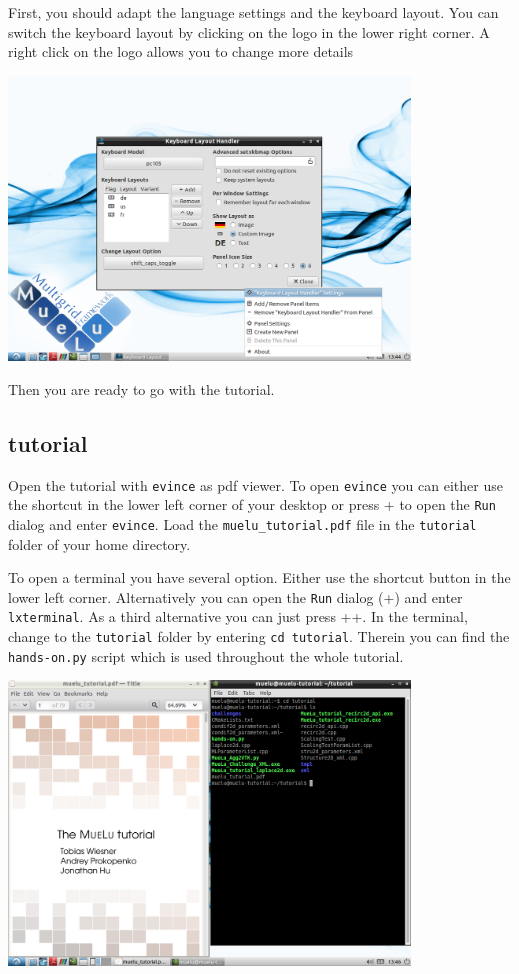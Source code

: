\documentclass[10pt,fleqn]{book}
\begin{document}
First, you should adapt the language settings and the keyboard layout. You can switch the keyboard layout by clicking on the logo in the lower right corner. A right click on the logo allows you to change more details
\begin{center}\includegraphics[width=0.8\textwidth]{pics/lubuntu_3.png} \end{center}

Then you are ready to go with the tutorial.

\subsection{\muelu tutorial}

Open the tutorial with \verb|evince| as pdf viewer. To open \verb|evince| you can either use the shortcut in the lower left corner of your desktop or press \Alt+ to open the \verb|Run| dialog and enter \verb|evince|. Load the \verb|muelu_tutorial.pdf| file in the \verb|tutorial| folder of your home directory.

To open a terminal you have several option. Either use the shortcut button in the lower left corner. Alternatively you can open the \verb|Run| dialog (\Alt+) and enter \verb|lxterminal|. As a third alternative you can just press \Ctrl+\Alt+. In the terminal, change to the \verb|tutorial| folder by entering \verb|cd tutorial|. Therein you can find the \verb|hands-on.py| script which is used throughout the whole \muelu tutorial.

\begin{center}\includegraphics[width=0.8\textwidth]{pics/lubuntu_4.png} \end{center}
\end{document}

